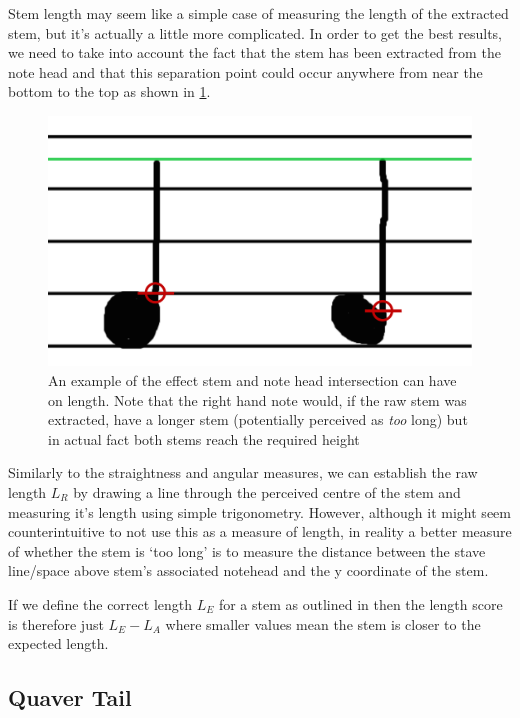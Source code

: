 Stem length may seem like a simple case of measuring the length of the extracted stem, but it's actually a little more complicated. In order to get the best results, we need to take into account the fact that the stem has been extracted from the note head and that this separation point could occur anywhere from near the bottom to the top as shown in \cref{fig:stem-intersection}.

\begin{figure}[h!]
    \centering
    \includegraphics[width=.8\textwidth]{gfx/techniques/stem-intersection-labelled.png}
    \caption{An example of the effect stem and note head intersection can have on length. Note that the right hand note would, if the raw stem was extracted, have a longer stem (potentially perceived as \emph{too} long) but in actual fact both stems reach the required height}
    \label{fig:stem-intersection}
\end{figure}

Similarly to the straightness and angular measures, we can establish the raw length $L_R$ by drawing a line through the perceived centre of the stem and measuring it's length using simple trigonometry. However, although it might seem counterintuitive to not use this as a measure of length, in reality a better measure of whether the stem is `too long' is to measure the distance between the stave line/space above stem's associated notehead and the y coordinate of the stem.

If we define the correct length $L_E$ for a stem as outlined in  then the length score is therefore just $L_E - L_A$ where smaller values mean the stem is closer to the expected length.

\subsection{Quaver Tail}

